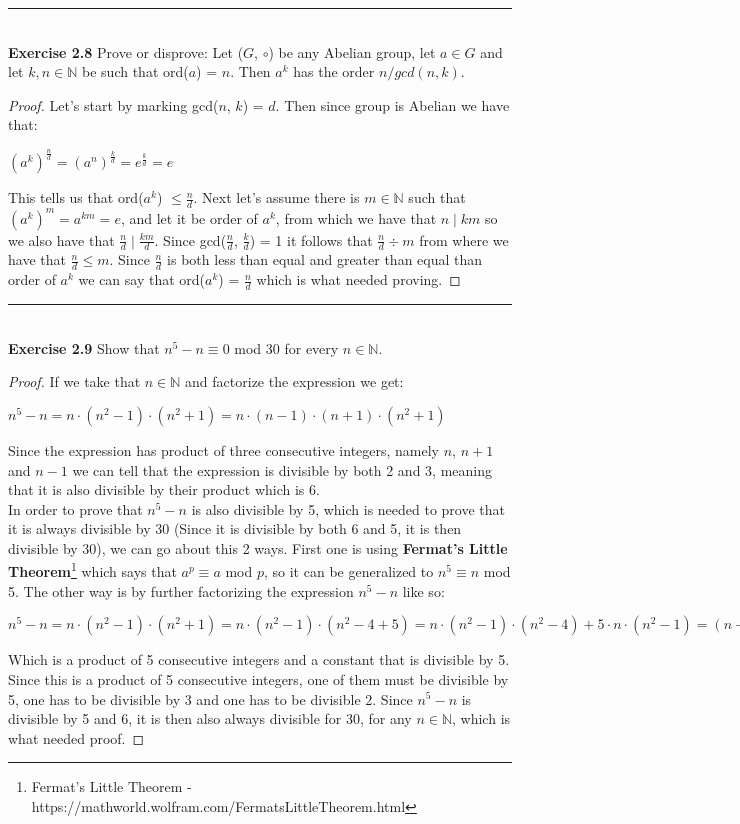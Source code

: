 \documentclass{article}
\begin{document}
\noindent\rule{12cm}{0.4pt}\\
\noindent \textbf{Exercise 2.8} Prove or disprove: Let ($G$, $\circ$) be any Abelian group, let $a \in G$ and let $k, n \in \mathbb{N}$ be such that ord($a$) = $n$. Then $a^{k}$ has the order $n/gcd(n,k)$.
\begin{proof}
Let's start by marking gcd($n$, $k$) = $d$. Then since group is Abelian we have that:
\begin{center}
$(a^k)^{\frac{n}{d}} = (a^n)^{\frac{k}{d}}= e^{\frac{k}{d}} = e$
\end{center}
This tells us that ord($a^k$) $\leq \frac{n}{d}$. Next let's assume there is $m \in \mathbb{N}$ such that $(a^k)^m=a^{km}=e$, and let it be order of $a^k$, from which we have that $n \mid km$ so we also have that $\frac{n}{d} \mid \frac{km}{d}$. Since gcd($\frac{n}{d}$, $\frac{k}{d}$) = 1 it follows that $\frac{n}{d} \div m$ from where we have that $\frac{n}{d} \leq m$. Since $\frac{n}{d}$ is both less than equal and greater than equal than order of $a^k$ we can say that ord($a^k$) = $\frac{n}{d}$ which is what needed proving.
\end{proof}



\noindent\rule{12cm}{0.4pt}\\
\noindent \textbf{Exercise 2.9} Show that $n^5 - n \equiv 0$ mod 30 for every $n \in \mathbb{N}$.
\begin{proof}
If we take that $n \in \mathbb{N}$ and factorize the expression we get:
\begin{center}
$n^5 - n = n \cdot (n^2 - 1) \cdot (n^2 + 1) = n \cdot (n - 1) \cdot (n + 1) \cdot (n^2 + 1)$	
\end{center}
Since the expression has product of three consecutive integers, namely $n$, $n+1$ and $n-1$ we can tell that the expression is divisible by both 2 and 3, meaning that it is also divisible by their product which is 6.\\
In order to prove that $n^5 - n$ is also divisible by 5, which is needed to prove that it is always divisible by 30 (Since it is divisible by both 6 and 5, it is then divisible by 30), we can go about this 2 ways. First one is using \textbf{Fermat's Little Theorem}\footnote{Fermat's Little Theorem - https://mathworld.wolfram.com/FermatsLittleTheorem.html} which says that $a^p \equiv a$ mod $p$, so it can be generalized to $n^5 \equiv n$ mod 5. The other way is by further factorizing the expression $n^5 - n$ like so:
\begin{center}
$n^5 - n = n \cdot (n^2 - 1) \cdot (n^2 + 1) = n \cdot (n^2 - 1) \cdot (n^2 - 4 + 5) = n \cdot (n^2 - 1) \cdot (n^2 - 4) + 5 \cdot n \cdot (n^2 - 1) = (n - 2) \cdot (n -1) \cdot n \cdot (n + 1) \cdot (n + 2) + 5$
\end{center}
Which is a product of 5 consecutive integers and a constant that is divisible by 5. Since this is a product of 5 consecutive integers, one of them must be divisible by 5, one has to be divisible by 3 and one has to be divisible 2. Since $n^5 - n$ is divisible by 5 and 6, it is then also always divisible for 30, for any $n \in \mathbb{N}$, which is what needed proof.

\end{proof}
\end{document}

